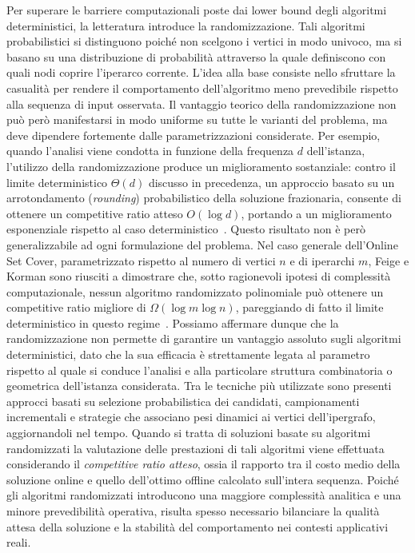 Per superare le barriere computazionali poste dai lower bound degli algoritmi deterministici, la letteratura introduce la randomizzazione.
Tali algoritmi probabilistici si distinguono poiché non scelgono i vertici in modo univoco, ma si basano su una distribuzione di probabilità attraverso la quale definiscono con quali nodi coprire l'iperarco corrente.
L'idea alla base consiste nello sfruttare la casualità per rendere il comportamento dell'algoritmo meno prevedibile rispetto alla sequenza di input osservata.
Il vantaggio teorico della randomizzazione non può però manifestarsi in modo uniforme su tutte le varianti del problema, ma deve dipendere fortemente dalle parametrizzazioni considerate.
Per esempio, quando l'analisi viene condotta in funzione della frequenza $d$ dell'istanza, l'utilizzo della randomizzazione produce un miglioramento sostanziale: contro il limite deterministico $\Theta(d)$ discusso in precedenza, un approccio basato su un arrotondamento (\emph{rounding}) probabilistico della soluzione frazionaria, consente di ottenere un competitive ratio atteso $O(\log d)$, portando a un miglioramento esponenziale rispetto al caso deterministico~\cite{buchbinder2009}.
Questo risultato non è però generalizzabile ad ogni formulazione del problema.
Nel caso generale dell'Online Set Cover, parametrizzato rispetto al numero di vertici $n$ e di iperarchi $m$, Feige e Korman sono riusciti a dimostrare che, sotto ragionevoli ipotesi di complessità computazionale, nessun algoritmo randomizzato polinomiale può ottenere un competitive ratio migliore di $\Omega(\log m \log n)$, pareggiando di fatto il limite deterministico in questo regime~\cite{korman2004}.
Possiamo affermare dunque che la randomizzazione non permette di garantire un vantaggio assoluto sugli algoritmi deterministici, dato che la sua efficacia è strettamente legata al parametro rispetto al quale si conduce l'analisi e alla particolare struttura combinatoria o geometrica dell'istanza considerata.
Tra le tecniche più utilizzate sono presenti approcci basati su selezione probabilistica dei candidati, campionamenti incrementali e strategie che associano pesi dinamici ai vertici dell'ipergrafo, aggiornandoli nel tempo.
Quando si tratta di soluzioni basate su algoritmi randomizzati la valutazione delle prestazioni di tali algoritmi viene effettuata considerando il \emph{competitive ratio atteso}, ossia il rapporto tra il costo medio della soluzione online e quello dell'ottimo offline calcolato sull'intera sequenza.
Poiché gli algoritmi randomizzati introducono una maggiore complessità analitica e una minore prevedibilità operativa, risulta spesso necessario bilanciare la qualità attesa della soluzione e la stabilità del comportamento nei contesti applicativi reali.

